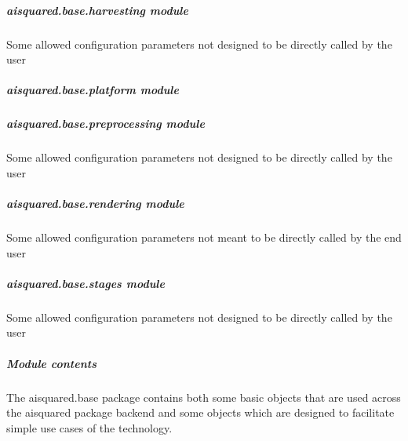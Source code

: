 \documentclass[letterpaper,10pt,english]{sphinxmanual}
\begin{document}
\subparagraph{aisquared.base.harvesting module}
\label{\detokenize{aisquared.base:module-aisquared.base.harvesting}}\label{\detokenize{aisquared.base:aisquared-base-harvesting-module}}
\sphinxAtStartPar
Some allowed configuration parameters \sphinxhyphen{} not designed to be directly called by the user


\subparagraph{aisquared.base.platform module}
\label{\detokenize{aisquared.base:aisquared-base-platform-module}}

\subparagraph{aisquared.base.preprocessing module}
\label{\detokenize{aisquared.base:module-aisquared.base.preprocessing}}\label{\detokenize{aisquared.base:aisquared-base-preprocessing-module}}
\sphinxAtStartPar
Some allowed configuration parameters \sphinxhyphen{} not designed to be directly called by the user


\subparagraph{aisquared.base.rendering module}
\label{\detokenize{aisquared.base:module-aisquared.base.rendering}}\label{\detokenize{aisquared.base:aisquared-base-rendering-module}}
\sphinxAtStartPar
Some allowed configuration parameters \sphinxhyphen{} not meant to be directly called by the end user


\subparagraph{aisquared.base.stages module}
\label{\detokenize{aisquared.base:module-aisquared.base.stages}}\label{\detokenize{aisquared.base:aisquared-base-stages-module}}
\sphinxAtStartPar
Some allowed configuration parameters \sphinxhyphen{} not designed to be directly called by the user


\subparagraph{Module contents}
\label{\detokenize{aisquared.base:module-aisquared.base}}\label{\detokenize{aisquared.base:module-contents}}
\sphinxAtStartPar
The aisquared.base package contains both some basic objects that are used across the aisquared package backend and some objects which are designed to facilitate simple use cases of the technology.
\end{document}

